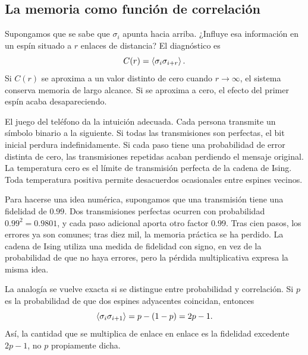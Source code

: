 \begin{classroomqa}
\end{classroomqa}

\subsection{La memoria como función de correlación}

Supongamos que se sabe que \(\sigma_i\) apunta hacia arriba. ¿Influye esa información en un espín situado a \(r\) enlaces de distancia? El diagnóstico es
\begin{equation}
C(r)=\left\langle\sigma_i\sigma_{i+r}\right\rangle.
\end{equation}
Si \(C(r)\) se aproxima a un valor distinto de cero cuando \(r\to\infty\), el sistema conserva memoria de largo alcance. Si se aproxima a cero, el efecto del primer espín acaba desapareciendo.

El juego del teléfono da la intuición adecuada. Cada persona transmite un símbolo binario a la siguiente. Si todas las transmisiones son perfectas, el bit inicial perdura indefinidamente. Si cada paso tiene una probabilidad de error distinta de cero, las transmisiones repetidas acaban perdiendo el mensaje original. La temperatura cero es el límite de transmisión perfecta de la cadena de Ising. Toda temperatura positiva permite desacuerdos ocasionales entre espines vecinos.

Para hacerse una idea numérica, supongamos que una transmisión tiene una fidelidad de \(0.99\). Dos transmisiones perfectas ocurren con probabilidad \(0.99^2=0.9801\), y cada paso adicional aporta otro factor \(0.99\). Tras cien pasos, los errores ya son comunes; tras diez mil, la memoria práctica se ha perdido. La cadena de Ising utiliza una medida de fidelidad con signo, en vez de la probabilidad de que no haya errores, pero la pérdida multiplicativa expresa la misma idea.

La analogía se vuelve exacta si se distingue entre probabilidad y correlación. Si \(p\) es la probabilidad de que dos espines adyacentes coincidan, entonces
\begin{equation}
\left\langle\sigma_i\sigma_{i+1}\right\rangle
=p-(1-p)=2p-1.
\end{equation}
Así, la cantidad que se multiplica de enlace en enlace es la fidelidad excedente \(2p-1\), no \(p\) propiamente dicha.

